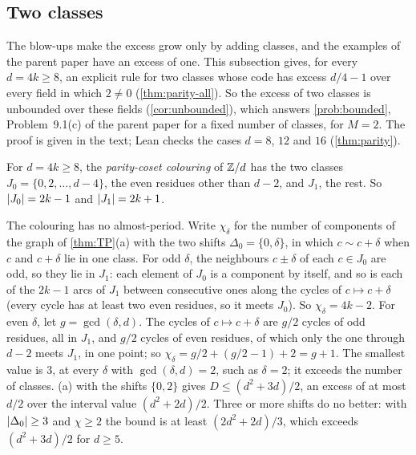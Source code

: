 \subsection{Two classes}\label{sec:twoclass}

The blow-ups make the excess grow only by adding classes, and the examples of the parent paper have an excess of one.
This subsection gives, for every $d=4k\ge8$, an explicit rule for two classes whose code has excess $d/4-1$ over every
field in which $2\ne0$ (\cref{thm:parity-all}). So the excess of two classes is unbounded over these fields
(\cref{cor:unbounded}), which answers \cref{prob:bounded}, Problem~9.1(c) of the parent paper for a fixed number of
classes, for $M=2$. The proof is given in the text; Lean checks the cases $d=8$, $12$ and $16$ (\cref{thm:parity}).

\begin{definition}\label{def:parity}
For $d=4k\ge8$, the \emph{parity-coset colouring} of $\mathbb{Z}/d$ has the two classes $J_0=\{0,2,\dots,d-4\}$, the even
residues other than $d-2$, and $J_1$, the rest. So $\lvert J_0 \rvert=2k-1$ and $\lvert J_1 \rvert=2k+1$.
\end{definition}

The colouring has no almost-period. Write $\chi_\delta$ for the number of components of the graph of
\cref{thm:TP}(a) with the two shifts $\Delta_0=\{0,\delta\}$, in which $c\sim c+\delta$ when $c$ and $c+\delta$ lie in
one class. For odd $\delta$, the neighbours $c\pm\delta$ of each $c\in J_0$ are odd, so they lie in $J_1$: each element of
$J_0$ is a component by itself, and so is each of the $2k-1$ arcs of $J_1$ between consecutive ones along the cycles of
$c\mapsto c+\delta$ (every cycle has at least two even residues, so it meets $J_0$). So $\chi_\delta=4k-2$. For even $\delta$,
let $g=\gcd(\delta,d)$. The cycles of $c\mapsto c+\delta$ are $g/2$ cycles of odd residues, all in $J_1$, and $g/2$
cycles of even residues, of which only the one through $d-2$ meets $J_1$, in one point; so
$\chi_\delta=g/2+(g/2-1)+2=g+1$. The smallest value is $3$, at every $\delta$ with $\gcd(\delta,d)=2$, such as
$\delta=2$; it exceeds the number of classes. (a) with the shifts $\{0,2\}$ gives $D\le(d^2+3d)/2$, an
excess of at most $d/2$ over the interval value $(d^2+2d)/2$. Three or more shifts do no better: with
$\lvert \Delta_0 \rvert\ge3$ and $\chi\ge2$ the bound is at least $(2d^2+2d)/3$, which exceeds $(d^2+3d)/2$ for $d\ge5$.

